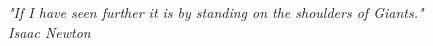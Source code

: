 \begin{epigrafe}
    \vspace*{\fill}
	\begin{flushright}
		\textit{"If I have seen further it is by standing on the shoulders of Giants." \\
        Isaac Newton
		}
	\end{flushright}
\end{epigrafe}
